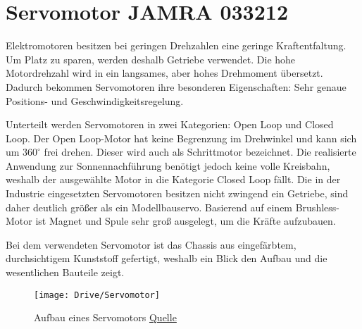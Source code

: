 %
%
%

	
\chapter{Servomotor JAMRA 033212}




Elektromotoren besitzen bei geringen Drehzahlen eine geringe Kraftentfaltung. Um Platz zu sparen, werden deshalb Getriebe verwendet. Die hohe Motordrehzahl wird in ein langsames, aber hohes Drehmoment übersetzt. Dadurch bekommen Servomotoren ihre besonderen Eigenschaften: Sehr genaue Positions- und Geschwindigkeitsregelung. \cite{Bernstein:2018} 

\bigskip

Unterteilt werden Servomotoren in zwei Kategorien: Open Loop und Closed Loop. Der Open Loop-Motor hat keine Begrenzung im Drehwinkel und kann sich um $360^\circ$ frei drehen. Dieser wird auch als Schrittmotor bezeichnet. Die realisierte Anwendung zur Sonnennachführung benötigt jedoch keine volle Kreisbahn, weshalb der ausgewählte Motor in die Kategorie Closed Loop fällt. Die in der Industrie eingesetzten Servomotoren besitzen nicht zwingend ein Getriebe, sind daher deutlich größer als ein Modellbauservo. Basierend auf einem Brushless-Motor ist Magnet und Spule sehr groß ausgelegt, um die Kräfte aufzubauen.  

\bigskip

Bei dem verwendeten Servomotor ist das Chassis aus eingefärbtem, durchsichtigem Kunststoff gefertigt, weshalb ein Blick den Aufbau und die wesentlichen Bauteile zeigt.

\begin{figure}
    \begin{flushleft}
        \texttt{[image: Drive/Servomotor]}
        \caption{Aufbau eines Servomotors \href{https://a.pololu-files.com/picture/0J3188.450.jpg?8db0bf79b0d26db613e6730cedbc62f7}{Quelle}}
    \end{flushleft}
\end{figure}



